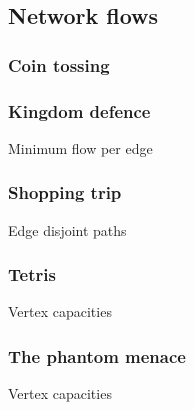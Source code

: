 \documentclass[10pt,a4paper,landscape,twocolumn,twoside]{article}
\begin{document}
	\newpage
	\subsection{Network flows}
	\label{sub:Network flows}

		\subsubsection{Coin tossing}
		

		\subsubsection{Kingdom defence}
		\begin{keywords}Minimum flow per edge\end{keywords}
		

		\subsubsection{Shopping trip}
		\begin{keywords}Edge disjoint paths\end{keywords}
		

		\subsubsection{Tetris}
		\label{subs:tetris}
		\begin{keywords}Vertex capacities\end{keywords}
		

		\subsubsection{The phantom menace}
		\label{subs:menace}
		\begin{keywords}Vertex capacities\end{keywords}
		
\end{document}
